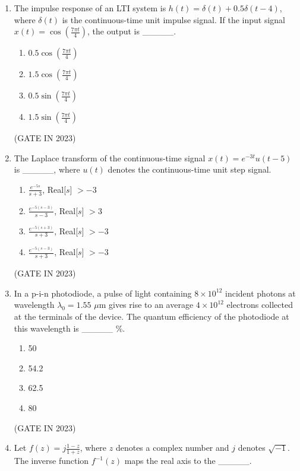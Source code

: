 \documentclass[journal]{IEEEtran}
\begin{document}
\begin{enumerate}
    \item The impulse response of an LTI system is $h(t) = \delta(t) + 0.5 \delta(t-4)$, where $\delta(t)$ is the continuous-time unit impulse signal. If the input signal $x(t) = \cos\left(\frac{7\pi t}{4}\right)$, the output is \_\_\_\_\_.
    
    \begin{enumerate}
        \item $0.5 \cos\left(\frac{7\pi t}{4}\right)$
        \item $1.5 \cos\left(\frac{7\pi t}{4}\right)$
        \item $0.5 \sin\left(\frac{7\pi t}{4}\right)$
        \item $1.5 \sin\left(\frac{7\pi t}{4}\right)$
    \end{enumerate}
    \hfill(GATE IN 2023)

    \item The Laplace transform of the continuous-time signal $x(t) = e^{-3t} u(t-5)$ is \_\_\_\_\_, where $u(t)$ denotes the continuous-time unit step signal.
    
    \begin{enumerate}
        \item $\frac{e^{-5s}}{s+3}$, Real[$s$] $> -3$
        \item $\frac{e^{-5(s-3)}}{s-3}$, Real[$s$] $> 3$
        \item $\frac{e^{-5(s+3)}}{s+3}$, Real[$s$] $> -3$
        \item $\frac{e^{-5(s-3)}}{s+3}$, Real[$s$] $> -3$
    \end{enumerate}
    \hfill(GATE IN 2023)

    \item In a p-i-n photodiode, a pulse of light containing $8 \times 10^{12}$ incident photons at wavelength $\lambda_0 = 1.55$ $\mu$m gives rise to an average $4 \times 10^{12}$ electrons collected at the terminals of the device. The quantum efficiency of the photodiode at this wavelength is \_\_\_\_\_ \%.
    
    \begin{enumerate}
        \item 50
        \item 54.2
        \item 62.5
        \item 80
    \end{enumerate}
    \hfill(GATE IN 2023)

    \item Let $f(z) = j \frac{1-z}{1+z}$, where $z$ denotes a complex number and $j$ denotes $\sqrt{-1}$. The inverse function $f^{-1}(z)$ maps the real axis to the \_\_\_\_\_.
    

\end{enumerate}
\end{document}
